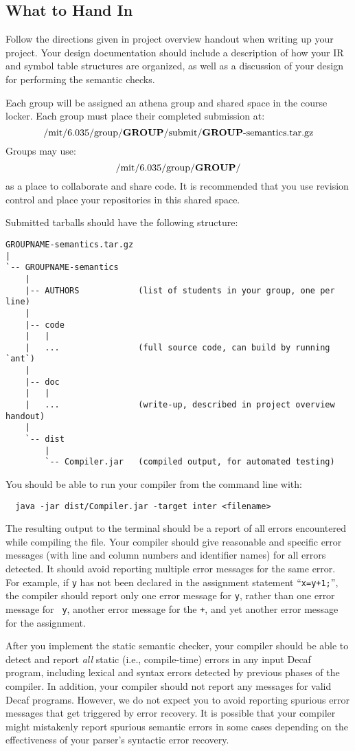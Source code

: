 \subsection*{What to Hand In}

Follow the directions given in project overview handout when writing up
your project.  Your design documentation should include a description of how
your IR and symbol table structures are organized, as well as a discussion
of your design for performing the semantic checks.

Each group will be assigned an athena group and shared space in the course locker.
Each group must place their completed submission at:\[
\mbox{/mit/6.035/group/{\bf GROUP}/submit/{\bf GROUP}-semantics.tar.gz}
\]
Groups may use:\[
\mbox{/mit/6.035/group/{\bf GROUP}/}
\]
as a place to collaborate and share code.  It is recommended that you use
revision control and place your repositories in this shared space.

Submitted tarballs should have the following structure:
{\scriptsize
\begin{verbatim}
GROUPNAME-semantics.tar.gz
|
`-- GROUPNAME-semantics
    |
    |-- AUTHORS            (list of students in your group, one per line)
    |
    |-- code
    |   |
    |   ...                (full source code, can build by running `ant`)
    |
    |-- doc 
    |   |
    |   ...                (write-up, described in project overview handout)
    |   
    `-- dist 
        |
        `-- Compiler.jar   (compiled output, for automated testing)
\end{verbatim}
}

You should be able to run
your compiler from the command line with:
\begin{verbatim}
  java -jar dist/Compiler.jar -target inter <filename>
\end{verbatim}
The resulting output to the terminal should be a report of all
errors encountered while compiling the file.  Your compiler should
give reasonable and specific error messages (with line and column
numbers and identifier names) for all errors detected. It should
avoid reporting multiple error messages for the same error. For
example, if {\tt y} has not been declared in the assignment
statement ``{\tt x=y+1;}'', the compiler should report only one
error message for {\tt y}, rather than one error message for {\tt
y}, another error message for the {\tt +}, and yet another error
message for the assignment.

After you implement the static semantic checker, your compiler should
be able to detect and report {\em all} static (i.e., compile-time)
errors in any input Decaf program, including lexical and syntax errors
detected by previous phases of the compiler. In addition, your
compiler should not report any messages for valid Decaf
programs. However, we do not expect you to avoid reporting spurious
error messages that get triggered by error recovery.  It is possible
that your compiler might mistakenly report spurious semantic errors in
some cases depending on the effectiveness of your parser's syntactic
error recovery.

